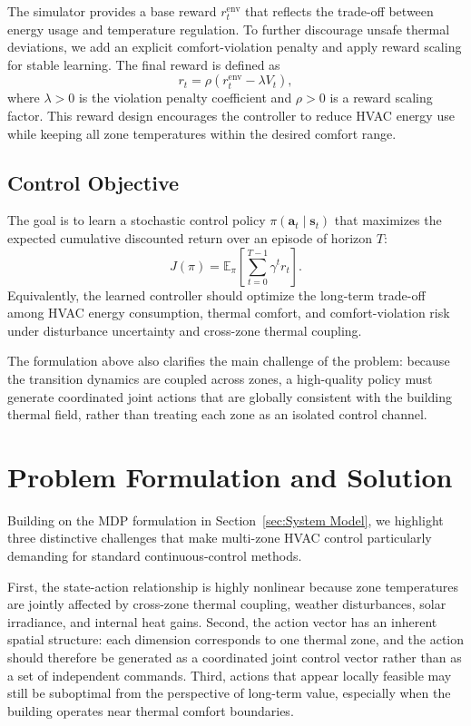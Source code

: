 \documentclass[lettersize,journal]{IEEEtran}
\theoremstyle{nonumberplain}     \theoremheaderfont{\bfseries\itshape}     \theorembodyfont{\normalfont}     \theoremseparator{:}     \theoremsymbol{\ensuremath{\blacksquare}}     \newtheorem{proof}{Proof}
\theoremstyle{plain}     \theoremheaderfont{\bfseries\itshape}     \theorembodyfont{\normalfont}     \theoremseparator{:}     \theoremsymbol{\ensuremath{\blacksquare}}     \newtheorem{remark}{Remark}
\begin{document}
The simulator provides a base reward $r_t^{\mathrm{env}}$ that reflects the trade-off between energy usage and temperature regulation. To further discourage unsafe thermal deviations, we add an explicit comfort-violation penalty and apply reward scaling for stable learning. The final reward is defined as
\begin{equation}
    r_t = \rho \left( r_t^{\mathrm{env}} - \lambda V_t \right),
    \label{eq:reward}
\end{equation}
where $\lambda > 0$ is the violation penalty coefficient and $\rho > 0$ is a reward scaling factor. This reward design encourages the controller to reduce HVAC energy use while keeping all zone temperatures within the desired comfort range.

\subsection{Control Objective}
The goal is to learn a stochastic control policy $\pi(\mathbf{a}_t \mid \mathbf{s}_t)$ that maximizes the expected cumulative discounted return over an episode of horizon $T$:
\begin{equation}
    J(\pi)
    =
    \mathbb{E}_{\pi}
    \left[
    \sum_{t=0}^{T-1} \gamma^t r_t
    \right].
    \label{eq:objective}
\end{equation}
Equivalently, the learned controller should optimize the long-term trade-off among HVAC energy consumption, thermal comfort, and comfort-violation risk under disturbance uncertainty and cross-zone thermal coupling.

The formulation above also clarifies the main challenge of the problem: because the transition dynamics are coupled across zones, a high-quality policy must generate coordinated joint actions that are globally consistent with the building thermal field, rather than treating each zone as an isolated control channel.


\section{Problem Formulation and Solution}
\label{sec:Problem Formulation and Solution}
\label{sec:method}

Building on the MDP formulation in Section~\ref{sec:System Model}, 
we highlight three distinctive challenges that make multi-zone HVAC 
control particularly demanding for standard continuous-control methods.

First, the state-action relationship is highly nonlinear because zone temperatures are jointly affected by cross-zone thermal coupling, weather disturbances, solar irradiance, and internal heat gains. Second, the action vector has an inherent spatial structure: each dimension corresponds to one thermal zone, and the action should therefore be generated as a coordinated joint control vector rather than as a set of independent commands. Third, actions that appear locally feasible may still be suboptimal from the perspective of long-term value, especially when the building operates near thermal comfort boundaries.
\end{document}
